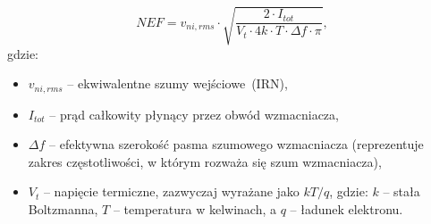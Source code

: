 \begin{frame}[t]
    \begin{block}{\dk}
    \end{block}
    \begin{equation}
        NEF = v_{ni,rms}\cdot\sqrt{\frac{2\cdot I_{tot}}{V_t\cdot 4k\cdot T \cdot \Delta f \cdot \pi}},
        \label{equ:NEF}
    \end{equation}
    gdzie:
    \begin{itemize}
        \item $v_{ni,rms}$ -- ekwiwalentne szumy wejściowe~(IRN), 
        \item $I_{tot}$ -- prąd całkowity płynący przez obwód wzmacniacza, 
        \item $\Delta f$ -- efektywna szerokość pasma szumowego wzmacniacza (reprezentuje zakres częstotliwości, w którym rozważa się szum wzmacniacza),
        \item $V_t$ -- napięcie termiczne, zazwyczaj wyrażane jako $kT/q$, gdzie: $k$ -- stała Boltzmanna, $T$ -- temperatura w kelwinach, a $q$ -- ładunek elektronu.
    \end{itemize}
    
\end{frame}

